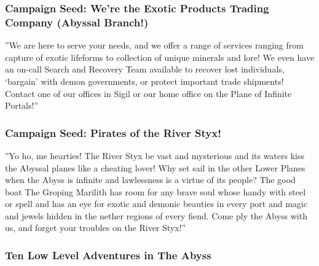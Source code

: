 \subsubsection{Campaign Seed: We're the Exotic Products Trading Company (Abyssal Branch!)}

''We are here to serve your needs, and we offer a range of services ranging from capture of exotic lifeforms to collection of unique minerals and lore! We even have an on-call Search and Recovery Team available to recover lost individuals, `bargain' with demon governments, or protect important trade shipments! Contact one of our offices in Sigil or our home office on the Plane of Infinite Portals!''

\subsubsection{Campaign Seed: Pirates of the River Styx!}

''Yo ho, me hearties! The River Styx be vast and mysterious and its waters kiss the Abyssal planes like a cheating lover! Why set sail in the other Lower Planes when the Abyss is infinite and lawlessness is a virtue of its people? The good boat The Groping Marilith has room for any brave soul whose handy with steel or spell and has an eye for exotic and demonic beauties in every port and magic and jewels hidden in the nether regions of every fiend. Come ply the Abyss with us, and forget your troubles on the River Styx!''

\subsubsection{Ten Low Level Adventures in The Abyss}


